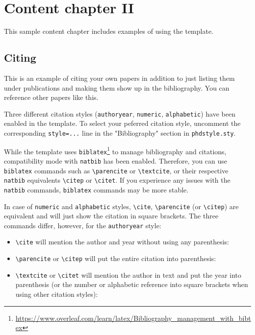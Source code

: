 \chapter{Content chapter II}
\label{chapterII}

This sample content chapter includes examples of using the template.

\section{Citing}

This is an example of citing your own papers \parencite{paper1,paper2} in addition to just listing them under publications and making them show up in the bibliography. You can reference other papers \parencite{einstein, knuthwebsite,latexcompanion} like this.

Three different citation styles (\texttt{authoryear}, \texttt{numeric}, \texttt{alphabetic}) have been enabled in the template. To select your peferred citation style, uncomment the corresponding \texttt{style=...} line in the "Bibliography" section in \texttt{phdstyle.sty}.

While the template uses \texttt{biblatex}\footnote{\url{https://www.overleaf.com/learn/latex/Bibliography_management_with_bibtex}} to manage bibliography and citations, compatibility mode with \texttt{natbib} has been enabled. Therefore, you can use \texttt{biblatex} commands such as \texttt{\textbackslash parencite} or \texttt{\textbackslash textcite}, or their respective \texttt{natbib} equivalents \texttt{\textbackslash citep} or \texttt{\textbackslash citet}. If you experience any issues with the \texttt{natbib} commands, \texttt{biblatex} commands may be more stable.

In case of \texttt{numeric} and \texttt{alphabetic} styles, \texttt{\textbackslash cite}, \texttt{\textbackslash parencite} (or \texttt{\textbackslash citep}) are equivalent and will just show the citation in square brackets. The three commands differ, however, for the \texttt{authoryear} style:

\begin{itemize}
    \item \texttt{\textbackslash cite} will mention the author and year without using any parenthesis: \cite{einstein}
    \item \texttt{\textbackslash parencite} or \texttt{\textbackslash citep} will put the entire citation into parenthesis: \parencite{einstein}
    \item \texttt{\textbackslash textcite} or \texttt{\textbackslash citet} will mention the author in text and put the year into parenthesis (or the number or alphabetic reference into square brackets when using other citation styles): \textcite{einstein}
\end{itemize}


